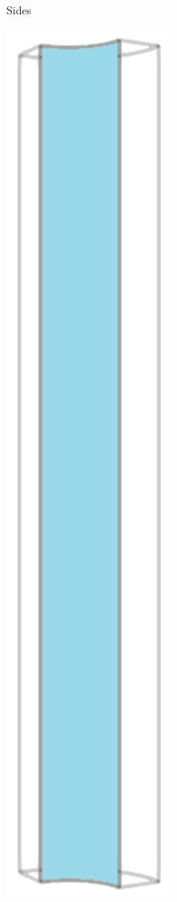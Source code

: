 \begin{figure}[!htb]
\begin{subfigure}{0.19\textwidth}
    \caption{Sides}
  \end{subfigure}
  \begin{subfigure}{0.19\textwidth}
    \centering
    \includegraphics[width=0.6\textwidth]{Chapter5/figures/spallation/geometry_inner}

\end{subfigure}
\end{figure}
